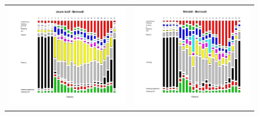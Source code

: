 \begin{figure}[H]
\centering
\begin{tabular}{cc}
\includegraphics[scale=0.38]{Images/Activites/JeuneActifBernoulli} &
\includegraphics[scale=0.38]{Images/Activites/RetraiteBernoulli} \\

\end{tabular}
\end{figure}
